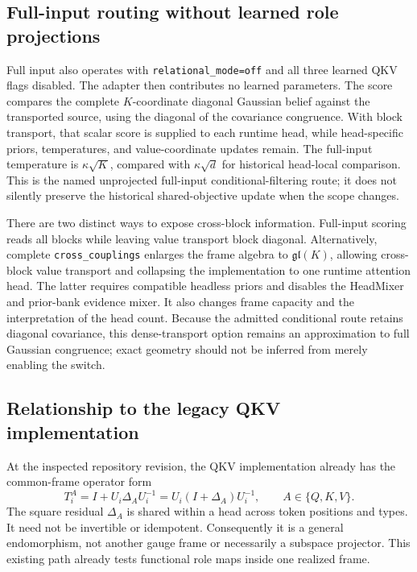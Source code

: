 \documentclass[11pt,letterpaper]{article}
\theoremstyle{remark}
\begin{document}
\subsection{Full-input routing without learned role projections}
\label{sec:unprojected-full}
Full input also operates with \texttt{relational\_mode=off} and all three learned QKV flags disabled. The adapter then contributes no learned parameters. The score compares the complete $K$-coordinate diagonal Gaussian belief against the transported source, using the diagonal of the covariance congruence. With block transport, that scalar score is supplied to each runtime head, while head-specific priors, temperatures, and value-coordinate updates remain. The full-input temperature is $\kappa\sqrt K$, compared with $\kappa\sqrt d$ for historical head-local comparison. This is the named unprojected full-input conditional-filtering route; it does not silently preserve the historical shared-objective update when the scope changes.

There are two distinct ways to expose cross-block information. Full-input scoring reads all blocks while leaving value transport block diagonal. Alternatively, complete \texttt{cross\_couplings} enlarges the frame algebra to $\mathfrak{gl}(K)$, allowing cross-block value transport and collapsing the implementation to one runtime attention head. The latter requires compatible headless priors and disables the HeadMixer and prior-bank evidence mixer. It also changes frame capacity and the interpretation of the head count. Because the admitted conditional route retains diagonal covariance, this dense-transport option remains an approximation to full Gaussian congruence; exact geometry should not be inferred from merely enabling the switch.

\subsection{Relationship to the legacy QKV implementation}
At the inspected repository revision, the QKV implementation already has the common-frame operator form
\begin{equation}
 T_i^A=I+U_i\Delta_AU_i^{-1}
 =U_i(I+\Delta_A)U_i^{-1},\qquad A\in\{Q,K,V\}.
 \label{eq:live-map}
\end{equation}
The square residual $\Delta_A$ is shared within a head across token positions and types. It need not be invertible or idempotent. Consequently it is a general endomorphism, not another gauge frame or necessarily a subspace projector. This existing path already tests functional role maps inside one realized frame.
\end{document}
